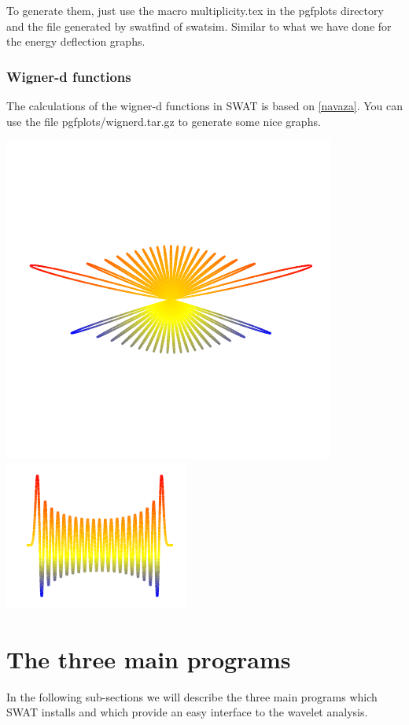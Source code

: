 \documentclass[12pt]{article}
\begin{document}
To generate them, just use the macro multiplicity.tex in the pgfplots directory
and the file generated by swatfind of swatsim. Similar to what we have done for
the energy deflection graphs.

\subsubsection{Wigner-d functions}

The calculations of the wigner-d functions in SWAT is based on \ref{navaza}. You can 
use the file pgfplots/wignerd.tar.gz to generate some nice graphs.

\includegraphics[scale=1.0]{wignerpolar.pdf}  
\includegraphics[scale=1.0]{wigner.pdf} 

\section{The three main programs}
In the following sub-sections we will describe the three main programs which 
SWAT installs and which provide an easy interface to the wavelet analysis.
\end{document}
